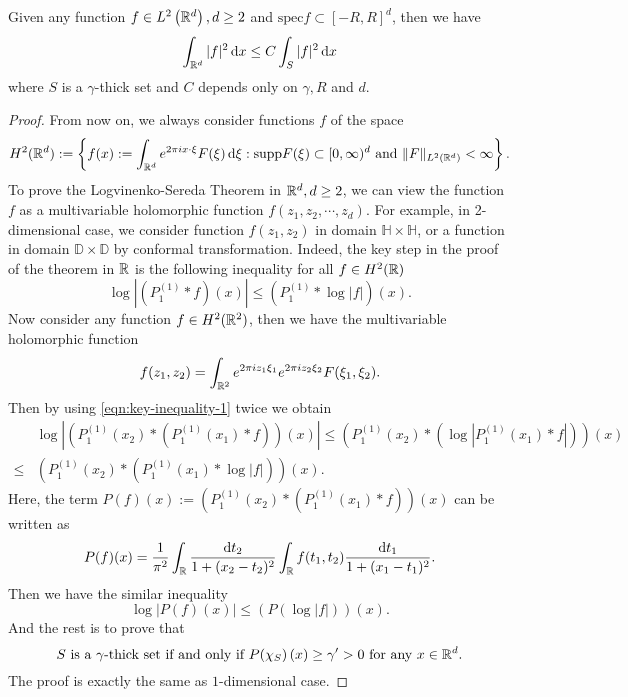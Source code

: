 \begin{theorem}
	Given any function $f\in L^2\left( \mathbb{R}^{d} \right),d\ge 2 $ and $\mathrm{spec}f \subset [-R,R]^{d} $, then we have 
	\begin{equation}
		\int_{\mathbb{R}^{d}}|f|^2\,\mathrm{d} x\le C\int_{S}|f|^2\,\mathrm{d} x
	\end{equation}
	where $S$ is a $\gamma$-thick set and $C$ depends only on $\gamma,R$ and $d$.
\end{theorem}
\begin{proof}
From now on, we always consider  functions $f$ of the space
\[
	H^2(\mathbb{R}^{d}):=\left\{f(x):=\int_{\mathbb{R}^{d}}e^{2\pi ix\cdot \xi}F(\xi)\,\mathrm{d} \xi: \mathrm{supp}F(\xi)\subset [0,\infty)^{d} \text{ and } \|F\|_{L^2(\mathbb{R}^{d})}<\infty\right\}.
\]
To prove the Logvinenko-Sereda Theorem in $\mathbb{R}^{d},d\ge 2$, we can view the function $f$ as a multivariable holomorphic function  $f(z_1,z_2,\cdots ,z_d)$. For example, in 2-dimensional case, we consider function $f(z_1,z_2)$ in domain $\mathbb{H}\times \mathbb{H}$, or a function in domain $\mathbb{D}\times \mathbb{D}$ by conformal transformation. Indeed, the key step in the proof of the theorem in $\mathbb{R}$ is the following inequality for all $f\in H^2(\mathbb{R})$
\begin{equation}\label{eqn:key-inequality-1}
\log |(P_1^{(1)}*f)(x)|\le \left( P_1^{(1)}*\log|f| \right) (x).
\end{equation}
Now consider any function $f\in {H}^2(\mathbb{R}^2)$, then we have the multivariable holomorphic function
\[
f(z_1,z_2)=\int_{\mathbb{R}^2}e^{2\pi iz_1\xi_1}e^{2\pi i z_2\xi_2}F(\xi_1,\xi_2).
\] 
Then by using \cref{eqn:key-inequality-1} twice we obtain
\begin{align*}
	&\log |\left(P_1^{(1)}(x_2)*\left( P_1^{(1)}(x_1)*f \right) \right)(x) |\le \left( P_1^{(1)}(x_2)*\left( \log| P_1^{(1)}(x_1)*f| \right)  \right) (x) \\
	\le & \left( P_1^{(1)}(x_2)*\left( P_1^{(1)}(x_1)*\log|f| \right)  \right) (x).
\end{align*}
Here, the term  $ P(f)(x):=\left(P_1^{(1)}(x_2)*\left( P_1^{(1)}(x_1)*f \right) \right)(x)$ can be written as
\begin{equation}
	 P(f)(x)=\frac{1}{\pi^2}\int_{\mathbb{R}}\frac{\mathrm{d}t_2}{1+(x_2-t_2)^2}\int_{\mathbb{R}}f(t_1,t_2)\frac{\mathrm{d}t_1}{1+(x_1-t_1)^2}.
\end{equation}
Then we have the similar inequality
\begin{equation}
	\log |P(f)(x)|\le \left( P(\log|f|) \right) (x).
\end{equation}
And the rest is to prove that 
\[
S \text{ is a }\gamma\text{-thick set if and only if } P(\chi_S)\left( x \right)\ge \gamma'>0 \text{ for any }x\in \mathbb{R}^{d}. 
\]
The proof is exactly the same as $1$-dimensional case.

\end{proof}


